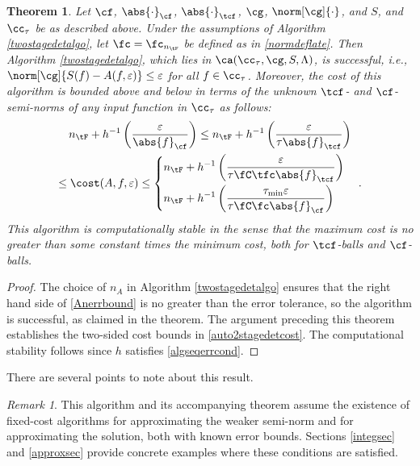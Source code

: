 \documentclass[]{elsarticle}
\newtheorem{theorem}{Theorem}
\theoremstyle{definition}
\theoremstyle{remark}
\newtheorem{rem}{Remark}
\newcommand{\Fnorm}[1]{\abs{#1}_{\cf}}
\newcommand{\Ftnorm}[1]{\abs{#1}_{\tcf}}
\newcommand{\Gnorm}[1]{\norm[\cg]{#1}}
\begin{document}
\begin{theorem}  \label{TwoStageDetermThm}  Let $\cf$, $\Fnorm{\cdot}$, $\Ftnorm{\cdot}$, $\cg$, $\Gnorm{\cdot}$, and $S$, and $\cc_\tau$ be as described above.  Under the assumptions of Algorithm \ref{twostagedetalgo}, let $\fc=\fc_{n_{\tF}}$ be defined as in \eqref{normdeflate}.  Then Algorithm \ref{twostagedetalgo}, which lies in $\ca(\cc_{\tau},\cg,S,\Lambda)$, is successful,  i.e.,  $\norm[\cg]{S(f)-A(f,\varepsilon)} \le \varepsilon$ for all $f \in \cc_\tau$.  Moreover, the cost of this algorithm is bounded above and below in terms of the unknown $\tcf$- and $\cf$-semi-norms of any input function in $\cc_{\tau}$ as follows:
\begin{multline}  \label{auto2stagedetcost}
n_{\tF}+ h^{-1}\left(\frac{\varepsilon}{\Fnorm{f}} \right)  \le n_{\tF}+ h^{-1}\left(\frac{\varepsilon}{\tau \Ftnorm{f}} \right) \\ \le 
\cost(A,f,\varepsilon)
\le \begin{cases}
\displaystyle n_{\tF}+ h^{-1}\left(\frac{\varepsilon}{\tau \fC\tfc\Ftnorm{f}}\right) \\[2ex]
\displaystyle n_{\tF}+h^{-1}\left(\frac{\tau_{\min}\varepsilon}{\tau \fC\fc\Fnorm{f}}\right)
\end{cases}.
\end{multline}
This algorithm is computationally stable in the sense that the maximum cost is no greater than some constant times the minimum cost, both for $\tcf$-balls and $\cf$-balls.
\end{theorem}

\begin{proof} The choice of $n_A$ in Algorithm \ref{twostagedetalgo} ensures that the right hand side of \eqref{Anerrbound} is no greater than the error tolerance, so the algorithm is successful, as claimed in the theorem.  The argument preceding this theorem establishes the two-sided cost bounds in \eqref{auto2stagedetcost}. The computational stability follows since $h$ satisfies \eqref{algseqerrcond}.
\end{proof}

There are several points to note about this result.

\begin{rem} This algorithm and its accompanying theorem assume the existence of fixed-cost algorithms for approximating the weaker semi-norm and for approximating the solution, both with known error bounds. Sections \ref{integsec} and \ref{approxsec} provide concrete examples where these conditions are satisfied.
\end{rem}
\end{document}
